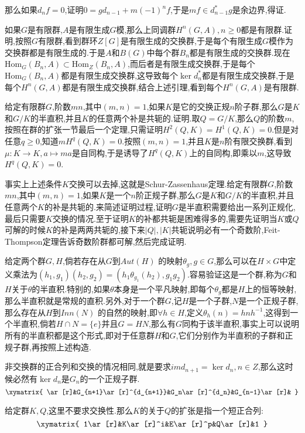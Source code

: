 那么如果$d_nf=0$,证明$0=gd_{n-1}+m(-1)^nf$,于是$mf\in d_{n-1}^*g$是余边界,得证.

如果$G$是有限群,$A$是有限生成$G$模,那么上同调群$H^n(G,A),n\ge0$都是有限群.证明,按照$G$有限群,看到群环$Z[G]$是有限生成的交换群,于是每个有限生成$G$模作为交换群都是有限生成的.于是$A$和$B(G)$中每个群$B_n$都是有限生成的交换群.现在$\mathrm{Hom}_G(B_n,A)\subset\mathrm{Hom}_Z(B_n,A)$,而后者是有限生成交换群,于是每个$\mathrm{Hom}_G(B_n,A)$都是有限生成交换群,这导致每个$\ker d_n^*$都是有限生成交换群,于是每个$H^n(G,A)$都是有限生成交换群,结合上述引理,看到每个$H^n(G,A)$是有限群.

给定有限群$G$,阶数$mn$,其中$(m,n)=1$,如果$K$是它的交换正规$n$阶子群,那么$G$是$K$和$G/K$的半直积,并且$K$的任意两个补是共轭的.证明.取$Q=G/K$,那么$Q$的阶数$m$,按照在群的扩张一节最后一个定理,只需证明$H^2(Q,K)=H^1(Q,K)=0$.但是对任意$q\ge0$,知道$mH^q(Q,K)=0$.按照$(m,n)=1$,并且$K$是$n$阶有限交换群,看到$\mu:K\to K,a\mapsto ma$是自同构,于是诱导了$H^q(Q,K)$上的自同构,即乘以$m$,这导致$H^q(Q,K)=0$.

事实上上述条件$K$交换可以去掉,这就是Schur-Zassenhaus定理.给定有限群$G$,阶数$mn$,其中$(m,n)=1$,如果$K$是一个$n$阶正规子群,那么$G$是$K$和$G/K$的半直积,并且任意两个$K$的补是共轭的.来简述证明过程,证明$G$是半直积需要给出一系列正规化,最后只需要$K$交换的情况.至于证明$K$的补都共轭是困难得多的,需要先证明当$K$或$Q$可解的时候$K$的补是两两共轭的,接下来$|Q|,|K|$共轭说明必有一个奇数阶,Feit-Thompson定理告诉奇数阶群都可解,然后完成证明.





给定两个群$G,H$,倘若存在从$G$到$Aut(H)$ 的映射$\theta_g,g\in G$,那么可以在$H\times G$中定义乘法为$(h_1,g_1) (h_2,g_2)=(h_1\theta_{g_1}(h_2),g_1g_2)$.容易验证这是一个群,称为$G$和$H$关于$\theta$的半直积.特别的,如果$\theta$本身是一个平凡映射,即每个$\theta_g$都是$H$上的恒等映射,那么半直积就是常规的直积.另外,对于一个群$G$,记$H$是一个子群,$N$是一个正规子群,那么存在从$H$到$Inn(N)$ 的自然的映射,即$\forall h\in H$,定义$\theta_h(n)=hnh^{-1}$,这得到一个半直积,倘若$H\cap N=\{e\}$并且$G=HN$,那么有$G$同构于该半直积,事实上可以说明所有的半直积都是这个形式,即对于任意群$H$和$G$,它们分别作为半直积的子群和正规子群,再按照上述构造.

非交换群的正合列和交换的情况相同,就是要求$im d_{n+1}=\ker d_n,n\in Z$,那么这时候必然有$\ker d_n$是$G_n$的一个正规子群.
$$\xymatrix{
	\ar[r]&G_{n+1}\ar[r]^{d_{n+1}}&G_n\ar[r]^{d_n}&G_{n-1}\ar[r]&
}$$

给定群$K,Q$,这里不要求交换性.那么$K$的关于$Q$的扩张是指一个短正合列:
$$\xymatrix{
	1\ar[r]&K\ar[r]^i&E\ar[r]^p&Q\ar[r]&1
}$$

